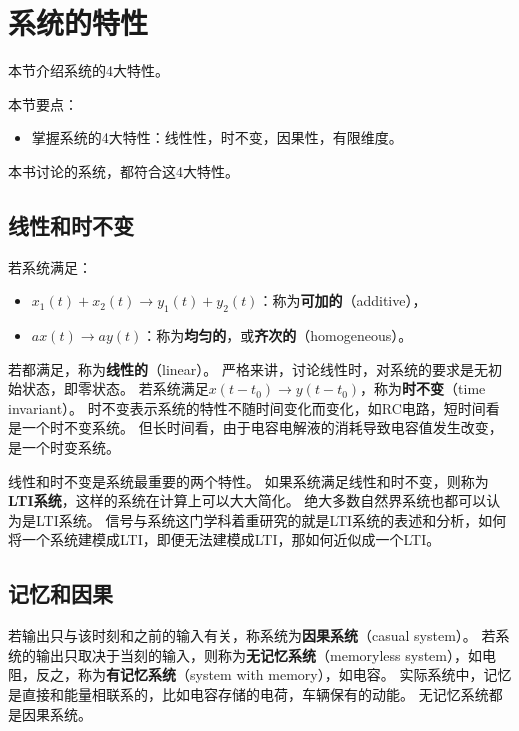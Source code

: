 \section{系统的特性}

本节介绍系统的4大特性。

本节要点：
\begin{itemize}
    \item 掌握系统的4大特性：线性性，时不变，因果性，有限维度。
\end{itemize}

\begin{tcolorbox}
本书讨论的系统，都符合这4大特性。
\end{tcolorbox}

\subsection{线性和时不变}

若系统满足：
\begin{itemize}
    \item $x_1\left( t \right) +x_2\left( t \right) \rightarrow y_1\left( t \right) +y_2\left( t \right) $：称为{\bf 可加的}（additive），
    \item $ax\left( t \right) \rightarrow ay\left( t \right) $：称为{\bf 均匀的}，或{\bf 齐次的}（homogeneous）。
\end{itemize}
若都满足，称为{\bf 线性的}（linear）。
严格来讲，讨论线性时，对系统的要求是无初始状态，即零状态。
若系统满足$x\left( t-t_0 \right) \rightarrow y\left( t-t_0 \right) $，称为{\bf 时不变}（time invariant）。
时不变表示系统的特性不随时间变化而变化，如RC电路，短时间看是一个时不变系统。
但长时间看，由于电容电解液的消耗导致电容值发生改变，是一个时变系统。

线性和时不变是系统最重要的两个特性。
如果系统满足线性和时不变，则称为{\bf LTI系统}，这样的系统在计算上可以大大简化。
绝大多数自然界系统也都可以认为是LTI系统。
信号与系统这门学科着重研究的就是LTI系统的表述和分析，如何将一个系统建模成LTI，即便无法建模成LTI，那如何近似成一个LTI。

\subsection{记忆和因果}

若输出只与该时刻和之前的输入有关，称系统为{\bf 因果系统}（casual system）。
若系统的输出只取决于当刻的输入，则称为{\bf 无记忆系统}（memoryless system），如电阻，反之，称为{\bf 有记忆系统}（system with memory），如电容。
实际系统中，记忆是直接和能量相联系的，比如电容存储的电荷，车辆保有的动能。
无记忆系统都是因果系统。

